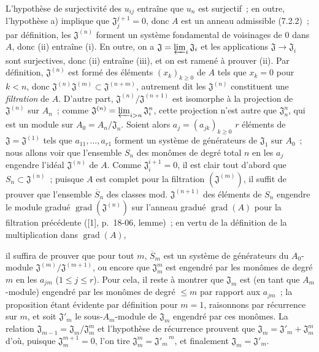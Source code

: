 L'hypothèse de surjectivité des $u_{ij}$ entraîne que $u_n$ est surjectif~;
en outre, l'hypothèse a) implique que $\mathfrak J_j^{j+1}=0$, donc $A$ est
un anneau admissible (7.2.2)~; par définition, les $\mathfrak J^{(n)}$ forment
un système fondamental de voisinages de $0$ dans $A$, donc (ii) entraîne (i).
En outre, on a $\mathfrak J=\varprojlim_i\mathfrak J_i$ et les applications
$\mathfrak J\to\mathfrak J_i$ sont surjectives, donc (ii) entraîne (iii), et
on est ramené à prouver (ii). Par définition, $\mathfrak J^{(n)}$ est formé
des éléments $(x_k)_{k\geq0}$ de $A$ tels que $x_k=0$ pour $k<n$, donc
$\mathfrak J^{(n)}\mathfrak J^{(m)}\subset\mathfrak J^{(n+m)}$, autrement dit
les $\mathfrak J^{(n)}$ constituent une \emph{filtration} de $A$. D'autre
part, $\mathfrak J^{(n)}/\mathfrak J^{(n+1)}$ est isomorphe à la projection de
$\mathfrak J^{(n)}$ sur $A_n$~; comme
$\mathfrak J^{(n)}=\varprojlim_{i>n}\mathfrak J_i^n$, cette projection n'est
autre que $\mathfrak J_n^n$, qui est un module sur
$A_0=A_n/\mathfrak J_n$. Soient alors $a_j=(a_{jk})_{k\geq0}$ $r$ éléments de
$\mathfrak J=\mathfrak J^{(1)}$ tels que $a_{11},\ldots,a_{r1}$ forment un
système de générateurs de $\mathfrak J_1$ sur $A_0$~; nous allons voir que
l'ensemble $S_n$ des monômes de degré total $n$ en les $a_j$ engendre l'idéal
$\mathfrak J^{(n)}$ de $A$. Comme $\mathfrak J_i^{i+1}=0$, il est clair tout
d'abord que $S_n\subset\mathfrak J^{(n)}$~; puisque $A$ est complet pour la
filtration $(\mathfrak J^{(m)})$, il suffit de prouver que l'ensemble
$\overline S_n$ des classes mod. $\mathfrak J^{(n+1)}$ des éléments de $S_n$
engendre le module gradué $\operatorname{grad}(\mathfrak J^{(n)})$ sur
l'anneau gradué $\operatorname{grad}(A)$ pour la filtration précédente
([1], p.~18-06, lemme)~; en vertu de la définition de la multiplication dans
$\operatorname{grad}(A)$,


il suffira de prouver que pour tout $m$, $\overline S_m$ est un système de
générateurs du $A_0$-module
$\mathfrak J^{(m)}/\mathfrak J^{(m+1)}$, ou encore que $\mathfrak J_m^m$ est
engendré par les monômes de degré $m$ en les $a_{jm}$ ($1\leq j\leq r$).
Pour cela, il reste à montrer que $\mathfrak J_m$ est (en tant que
$A_m$-module) engendré par les monômes de degré $\leq m$ par rapport aux
$a_{jm}$~; la proposition étant évidente par définition pour $m=1$,
raisonnons par récurrence sur $m$, et soit $\mathfrak J'_m$ le sous-$A_m$-module
de $\mathfrak J_m$ engendré par ces monômes. La relation
$\mathfrak J_{m-1}=\mathfrak J_m/\mathfrak J_m^m$ et l'hypothèse de récurrence
prouvent que $\mathfrak J_m=\mathfrak J'_m+\mathfrak J_m^m$ d'où, puisque
$\mathfrak J_m^{m+1}=0$, l'on tire
$\mathfrak J_m^m={\mathfrak J'_m}^{\,m}$, et finalement
$\mathfrak J_m=\mathfrak J'_m$.

